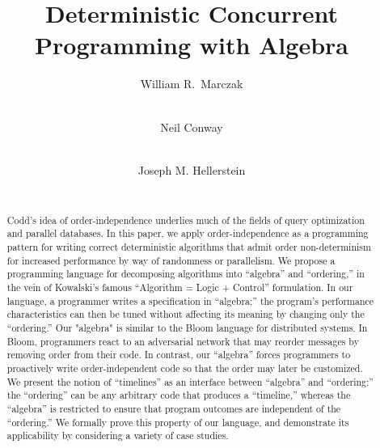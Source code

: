 \documentclass{sig-alternate}
\begin{document}
\title{Deterministic Concurrent Programming with Algebra}


%


\author{
\alignauthor William R.\ Marczak\\
\\
\and
\alignauthor Neil Conway\\
\\
\and
\alignauthor Joseph M. Hellerstein\\
\\
}

\toappear{}

\maketitle

\begin{abstract}
Codd's idea of order-independence underlies much of the fields of query
optimization and parallel databases.  In this paper, we apply
order-independence as a programming pattern for writing correct deterministic algorithms that admit order non-determinism for increased performance by way of randomness or parallelism.
We propose a programming language for decomposing algorithms
into ``algebra'' and ``ordering,'' in the vein of Kowalski's famous ``Algorithm
= Logic + Control'' formulation.  In our language, a programmer writes a
specification in ``algebra;'' the program's performance characteristics can
then be tuned without affecting its meaning by changing only the ``ordering.''
Our
"algebra" is similar to the Bloom language for distributed systems.  In
Bloom, programmers react to an adversarial network that may reorder
messages by removing order from their code.  In contrast, our ``algebra''
forces programmers to proactively write order-independent code so that the
order may later be customized.  We present the notion of ``timelines'' as an
interface between ``algebra'' and ``ordering:'' the ``ordering'' can be any
arbitrary code that produces a ``timeline,'' whereas the ``algebra'' is
restricted to ensure that program outcomes are independent of the
``ordering.''  We formally prove this property of our language, and
demonstrate its applicability by considering a variety of case studies.
\end{abstract}









%

\end{document}
